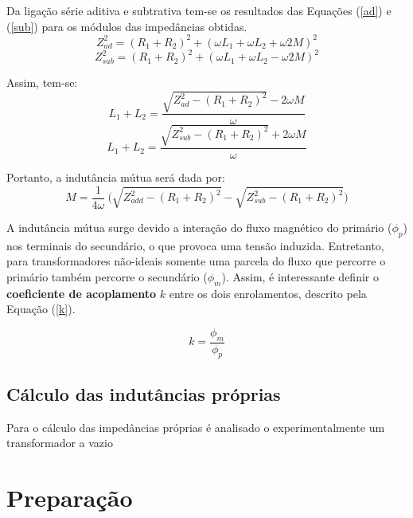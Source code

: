 \documentclass[a4paper,12pt,oneside,openany,table,xcdraw]{article}
\begin{document}
Da ligação série aditiva e subtrativa tem-se os resultados das Equações (\ref{ad}) e (\ref{sub}) para os módulos das impedâncias obtidas.
\begin{equation}\label{ad}
Z_{ad}^2=(R_1+R_2)^2+(\omega L_1+\omega L_2+\omega2M)^2
\end{equation}
\begin{equation}\label{sub}
Z_{sub}^2=(R_1+R_2)^2+(\omega L_1+\omega L_2-\omega2M)^2
\end{equation}

Assim, tem-se:
\begin{equation}
L_1+L_2=\dfrac{\sqrt{Z_{ad}^2-(R_1+R_2)^2}-2\omega M}{\omega}
\end{equation}
\begin{equation}
L_1+L_2=\dfrac{\sqrt{Z_{sub}^2-(R_1+R_2)^2}+2\omega M}{\omega}
\end{equation}
\vspace{0.1cm}

Portanto, a indutância mútua será dada por:
\begin{equation}\label{mutua}
M = \dfrac{1}{4\omega}\ \bigg(\sqrt{Z_{add}^2-(R_1+R_2)^2} - \sqrt{Z_{sub}^2-(R_1+R_2)^2}\bigg)
\end{equation}
\vspace{0.01cm}

A indutância mútua surge devido a interação do fluxo magnético do primário ($\phi_p$) nos terminais do secundário, o que provoca uma tensão induzida. Entretanto, para transformadores não-ideais somente uma parcela do fluxo que percorre o primário também percorre o secundário ($\phi_m$). Assim, é interessante definir o \textbf{coeficiente de acoplamento} $k$ entre os dois enrolamentos, descrito pela Equação (\ref{k}).

\begin{equation}\label{k}
k = \dfrac{\phi_m}{\phi_p}
\end{equation}

\subsection{Cálculo das indutâncias próprias}
Para o cálculo das impedâncias próprias é analisado o experimentalmente um transformador a vazio

\section{Preparação}
\end{document}
